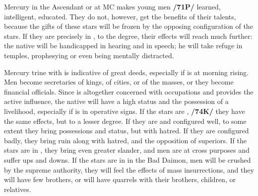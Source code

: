 Mercury in the Ascendant or at MC makes young men \textbf{/71P/} learned, intelligent, educated. They do
not, however, get the benefits of their talents, because the gifts of these stars will be frozen by the opposing configuration of the stars. If they are precisely in \Opposition, to the \mned degree, their effects will reach much further: the native will be handicapped in hearing and in speech; he will take refuge in temples, prophesying
or even being mentally distracted.

Mercury \marginnote{\Mercury \Trine \Jupiter} trine with \Jupiter\xspace is indicative of great deeds, especially if \Mercury\xspace is at morning rising. Men become secretaries of kings, of cities, or of the masses, or they become financial officials. Since \Mercury\xspace is
altogether concerned with occupations and provides the active influence, the native will have a high status and the possession of a livelihood, especially if \Mercury\xspace is in operative signs. If the stars are \Sextile, \textbf{/74K/}
they have the same effects, but to a lesser degree. If they are \Square\xspace and configured well, to some extent
they bring possessions and status, but with hatred. If they are configured badly, they bring ruin along with hatred, and the opposition of superiors. If the stars are in \Opposition, they bring even greater slander, and men are at cross purposes and suffer ups and downs. If the stars are in \Opposition\xspace in the Bad Daimon, men will be crushed by the supreme authority, they will feel the effects of mass insurrections, and they will have few brothers, or will have quarrels with their brothers, children, or relatives.

